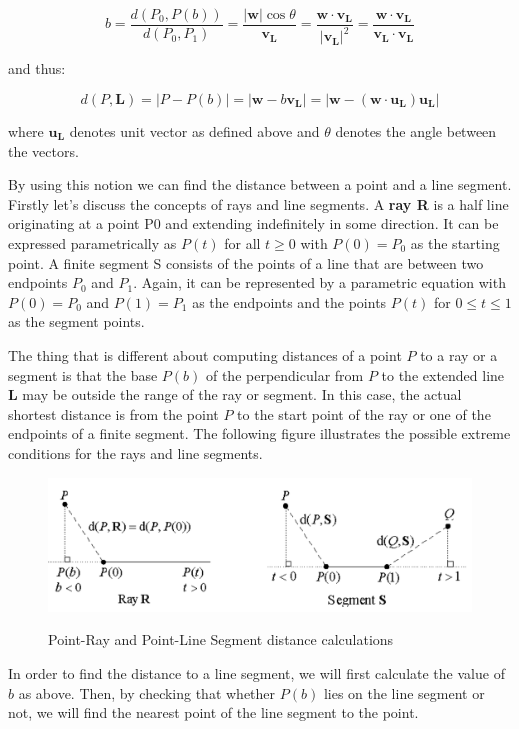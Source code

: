 \documentclass[12pt]{article}
\begin{document}
$$
  b =\frac{d(P_0,P(b))}{d(P_0, P_1)} 
    =\frac{|\pmb{w}|\cos \theta}{\pmb{v_L}} 
    =\frac{\pmb{w}\cdot\pmb{v_L}}{|\pmb{v_L}|^2}
    =\frac{ \pmb{w}\cdot\pmb{v_L} }{ \pmb{v_L}\cdot\pmb{v_L} }
$$

and thus:

$$
d(P,\pmb{L}) = |P-P(b)| = |\pmb{w} - b\pmb{v_L}| = |\pmb{w} - (\pmb{w}\cdot\pmb{u_L})\pmb{u_L}|
$$

where $\pmb{u_L}$ denotes unit vector as defined above and $\theta$ denotes the angle between the vectors.

By using this notion we can find the distance between a point and a line segment.
Firstly let's discuss the concepts of rays and line segments. 
A \textbf{ray R} is a half line originating at a point P0 and extending 
indefinitely in some direction. It can be expressed parametrically as 
$P(t)$ for all $t \geq 0$ with $P(0) = P_0$ as the starting point.
A finite segment S consists of the points of a line that are between two 
endpoints $P_0$ and $P_1$. Again, it can be represented by a parametric equation 
with $P(0) = P_0$ and $P(1) = P_1$ as the endpoints and the points $P(t)$ for 
$0\leq t \leq 1$ as the segment points.

The thing that is different about computing distances of a point $P$ to a ray 
or a segment is that the base $P(b)$ of the perpendicular from $P$ to the extended 
line $\pmb{L}$ may be outside the range of the ray or segment. In this case, the actual 
shortest distance is from the point $P$ to the start point of the ray or one of 
the endpoints of a finite segment. The following figure illustrates the possible 
extreme conditions for the rays and line segments.

\begin{center}
  \begin{figure}[h]
    \centering
    \includegraphics[width=.9\linewidth]{figures/fig9.png}
    \label{fig:9}
    \caption{Point-Ray and Point-Line Segment distance calculations}
  \end{figure}
\end{center}


In order to find the distance to a line segment, we will first calculate the value of
$b$ as above. Then, by checking that whether $P(b)$ lies on the line segment or not,
we will find the nearest point of the line segment to the point.
\end{document}
